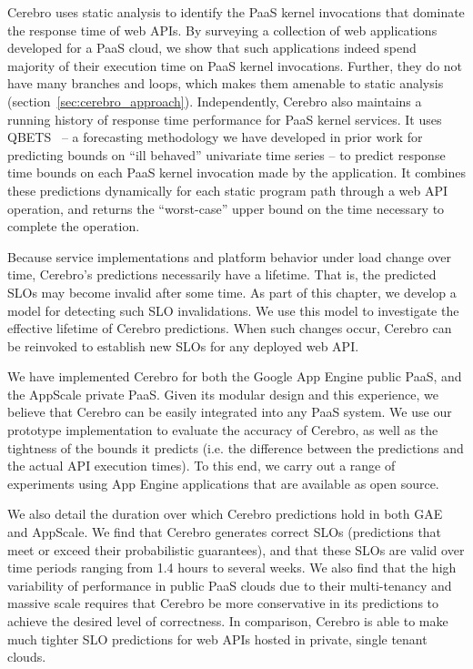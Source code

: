 Cerebro uses static analysis to identify the PaaS kernel invocations
that dominate the response time of web APIs. By surveying a collection of
web applications developed for a PaaS cloud, we show
that such applications indeed spend majority of their execution time on PaaS kernel
invocations. Further, they do not have many branches and loops, which
makes them amenable to static analysis (section~\ref{sec:cerebro_approach}). Independently,
Cerebro also maintains a running history of response time 
performance for PaaS kernel services.  It uses
QBETS~\cite{Nurmi:2007:QQB:1791551.1791556} -- a forecasting methodology
we have developed in prior work for predicting bounds on ``ill behaved''
univariate time series -- to predict response time bounds on each PaaS kernel
invocation made by the application.  It combines these predictions dynamically
for each static program path through a web API operation,
and returns the ``worst-case''
upper bound on the time necessary to 
complete the operation.

Because service implementations and platform behavior under load change over time,
Cerebro's predictions necessarily have a lifetime. That is, the predicted SLOs may
become invalid after some time.  
As part of this chapter, we develop a model for detecting such SLO invalidations. 
We use this model to investigate
the effective lifetime of Cerebro predictions. When such changes occur,
Cerebro can be reinvoked to establish new SLOs for any deployed web API.  

We have implemented Cerebro for both the Google App Engine public PaaS, and 
the AppScale private PaaS. Given its modular design and this experience, 
we believe that Cerebro can be easily integrated into any PaaS system.
We use our prototype implementation to evaluate the accuracy of Cerebro, 
as well as the tightness
of the bounds it predicts (i.e. the difference between the predictions and 
the actual API execution times). To this end, we carry out a range of experiments
 using App Engine applications that are available as open source.  

We also detail the duration over which 
Cerebro predictions hold in both GAE and AppScale.  
We find that Cerebro generates correct SLOs (predictions that meet or exceed their
probabilistic guarantees), and that these SLOs are valid over time periods ranging
from 1.4 hours to several weeks.  
We also find that the high variability of performance in public PaaS clouds due to their multi-tenancy
and massive scale requires that Cerebro be more conservative in its predictions 
to achieve the desired level of correctness. In comparison, Cerebro is able to make
much tighter SLO predictions for web APIs hosted in private, single tenant clouds.

